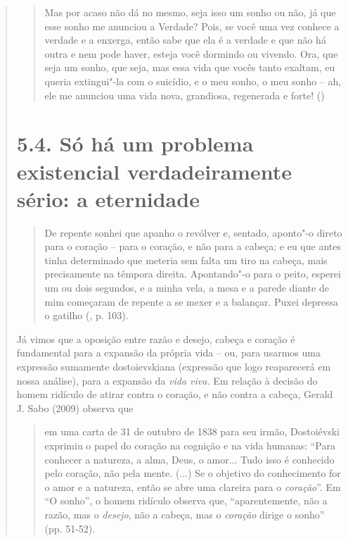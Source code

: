{\begin{quote}
\begin{quote}
Mas por acaso não dá no mesmo, seja isso um sonho ou não, já que esse
sonho me anunciou a Verdade? Pois, se você uma vez conhece a verdade e a
enxerga, então sabe que ela é a verdade e que não há outra e nem pode
haver, esteja você dormindo ou vivendo. Ora, que seja um sonho, que
seja, mas essa vida que vocês tanto exaltam, eu queria extingui"-la com o
suicídio, e o meu sonho, o meu sonho -- ah, ele me anunciou uma vida
nova, grandiosa, regenerada e forte! ()
\end{quote}

\section{5.4. Só há um problema existencial verdadeiramente sério: a
eternidade }

\begin{quote}
De repente sonhei que apanho o revólver e, sentado, aponto"-o direto para
o coração -- para o coração, e não para a cabeça; e eu que antes tinha
determinado que meteria sem falta um tiro na cabeça, mais precisamente
na têmpora direita. Apontando"-o para o peito, esperei um ou dois
segundos, e a minha vela, a mesa e a parede diante de mim começaram de
repente a se mexer e a balançar. Puxei depressa o gatilho (, p.
103).
\end{quote}

Já vimos que a oposição entre razão e desejo, cabeça e coração é
fundamental para a expansão da própria vida -- ou, para usarmos uma
expressão sumamente dostoievskiana (expressão que logo reaparecerá em
nossa análise), para a expansão da \emph{vida viva.} Em relação à
decisão do homem ridículo de atirar contra o coração, e não contra a
cabeça, Gerald J. Sabo (2009) observa que

\begin{quote}
em uma carta de 31 de outubro de 1838 para seu irmão, Dostoiévski
exprimiu o papel do coração na cognição e na vida humanas: ``Para
conhecer a natureza, a alma, Deus, o amor... Tudo isso é conhecido pelo
coração, não pela mente. (...) Se o objetivo do conhecimento for o amor
e a natureza, então se abre uma clareira para o \emph{coração}''. Em ``O
sonho'', o homem ridículo observa que, ``aparentemente, não a razão, mas
o \emph{desejo}, não a cabeça, mas o \emph{coração} dirige o sonho''
(pp. 51-52).
\end{quote}


\end{quote}}
